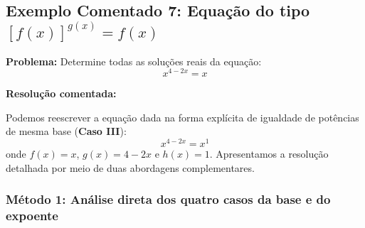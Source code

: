 \documentclass[12pt,a4paper]{report}
\begin{document}
	\vspace{0.3cm}
	
	\subsection*{Exemplo Comentado 7: Equação do tipo $[f(x)]^{g(x)} = f(x)$}
	
	\textbf{Problema:} Determine todas as soluções reais da equação:
	\[
	x^{4 - 2x} = x
	\]
	
	\textbf{Resolução comentada:}
	
	Podemos reescrever a equação dada na forma explícita de igualdade de potências de mesma base (\textbf{Caso III}):
	\[
	x^{4 - 2x} = x^1
	\]
	onde $f(x) = x$, $g(x) = 4 - 2x$ e $h(x) = 1$. Apresentamos a resolução detalhada por meio de duas abordagens complementares.
	
	\subsubsection*{Método 1: Análise direta dos quatro casos da base e do expoente}
	
\end{document}
